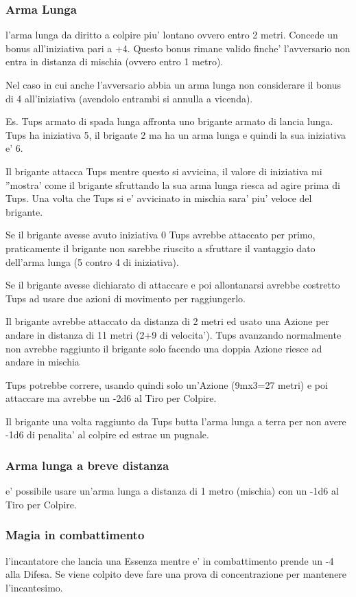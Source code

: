 \documentclass[a4paper,11pt,twoside,openany]{book}
\begin{document}
\subsubsection{Arma Lunga} l'arma lunga da diritto a colpire piu' lontano ovvero entro 2 metri. Concede un bonus all'iniziativa pari a +4. Questo bonus rimane valido finche' l'avversario non entra in distanza di mischia (ovvero entro 1 metro).

Nel caso in cui anche l'avversario abbia un arma lunga non considerare il bonus di 4 all'iniziativa (avendolo entrambi si annulla a vicenda).

Es. Tups armato di spada lunga affronta uno brigante armato di lancia lunga. Tups ha iniziativa 5, il brigante 2 ma ha un arma lunga e quindi la sua iniziativa e' 6.

Il brigante attacca Tups mentre questo si avvicina, il valore di iniziativa mi ''mostra' come il brigante sfruttando la sua arma lunga riesca ad agire prima di Tups. Una volta che Tups si e' avvicinato in mischia sara' piu' veloce del brigante.

Se il brigante avesse avuto iniziativa 0 Tups avrebbe attaccato per primo, praticamente il brigante non sarebbe riuscito a sfruttare il vantaggio dato dell'arma lunga (5 contro 4 di iniziativa).

Se il brigante avesse dichiarato di attaccare e poi allontanarsi avrebbe costretto Tups ad usare due azioni di movimento per raggiungerlo.

Il brigante avrebbe attaccato da distanza di 2 metri ed usato una Azione per andare in distanza di 11 metri (2+9 di velocita'). Tups avanzando normalmente non avrebbe raggiunto il brigante solo facendo una doppia Azione riesce ad andare in mischia

Tups potrebbe correre, usando quindi solo un'Azione (9mx3=27 metri) e poi attaccare ma avrebbe un -2d6 al Tiro per Colpire.

Il brigante una volta raggiunto da Tups butta l'arma lunga a terra per non avere -1d6 di penalita' al colpire ed estrae un pugnale.

\subsubsection{Arma lunga a breve distanza} e' possibile usare un'arma lunga a distanza di 1 metro (mischia) con un -1d6 al Tiro per Colpire.

\subsubsection{Magia in combattimento} l'incantatore che lancia una Essenza mentre e' in combattimento prende un -4 alla Difesa. Se viene colpito deve fare una prova di concentrazione per mantenere l'incantesimo.
\end{document}
